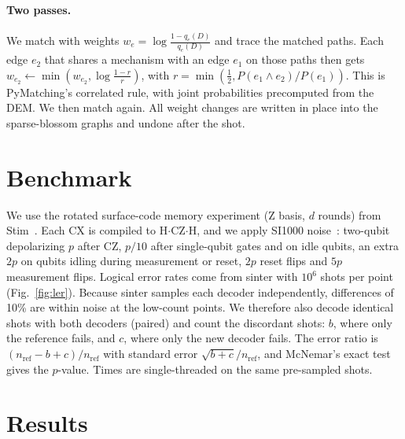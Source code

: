 \documentclass[aps,pra,twocolumn,superscriptaddress,nofootinbib]{revtex4-2}
\begin{document}
\paragraph{Two passes.}
We match with weights $w_e = \log\frac{1-q_e(D)}{q_e(D)}$ and trace the
matched paths. Each edge $e_2$ that shares a mechanism with an edge $e_1$ on
those paths then gets $w_{e_2} \leftarrow \min(w_{e_2}, \log\frac{1-r}{r})$,
with $r = \min(\tfrac12, P(e_1 \wedge e_2)/P(e_1))$. This is PyMatching's
correlated rule, with joint probabilities precomputed from the DEM. We then
match again. All weight changes are written in place into the sparse-blossom
graphs and undone after the shot.

\section{Benchmark}

We use the rotated surface-code memory experiment (Z basis, $d$ rounds) from
Stim~\cite{gidney2021stim}. Each CX is compiled to H$\cdot$CZ$\cdot$H, and
we apply SI1000 noise~\cite{gidney2022benchmarking}: two-qubit depolarizing
$p$ after CZ, $p/10$ after single-qubit gates and on idle qubits, an extra
$2p$ on qubits idling during measurement or reset, $2p$ reset flips and $5p$
measurement flips. Logical error rates come from sinter with $10^6$ shots
per point (Fig.~\ref{fig:ler}). Because sinter samples each decoder
independently, differences of 10\% are within noise at the low-count points.
We therefore also decode identical shots with both decoders (paired) and
count the discordant shots: $b$, where only the reference fails, and $c$,
where only the new decoder fails. The error ratio is
$(n_\mathrm{ref}-b+c)/n_\mathrm{ref}$ with standard error
$\sqrt{b+c}/n_\mathrm{ref}$, and McNemar's exact test gives the $p$-value. Times are
single-threaded on the same pre-sampled shots.

\section{Results}
\end{document}
